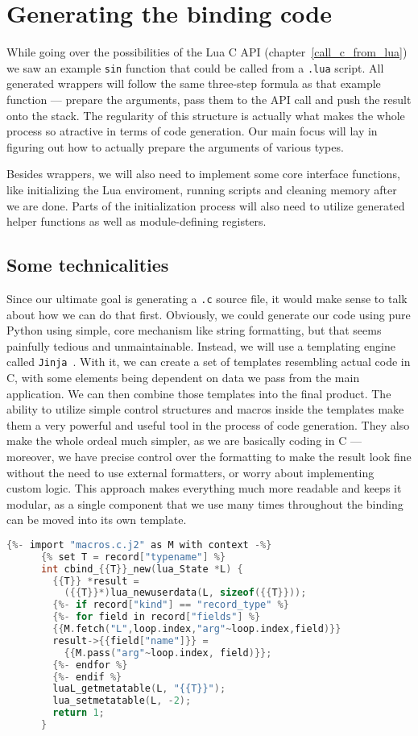 \documentclass[polish, english]{iithesis}
\begin{document}
\chapter{Generating the binding code}
  While going over the possibilities of the Lua C API (chapter~\ref{call_c_from_lua}) we saw an example \texttt{sin} function that could be called from a \texttt{.lua} script.
  All generated wrappers will follow the same three-step formula as that example function --- prepare the arguments, pass them to the API call and push the result onto the stack.
  The regularity of this structure is actually what makes the whole process so atractive in terms of code generation.
  Our main focus will lay in figuring out how to actually prepare the arguments of various types.

  Besides wrappers, we will also need to implement some core interface functions, like initializing the Lua enviroment, running scripts and cleaning memory after we are done.
  Parts of the initialization process will also need to utilize generated helper functions as well as module-defining registers.
  \section{Some technicalities}
    Since our ultimate goal is generating a \texttt{.c} source file, it would make sense to talk about how we can do that first.
    Obviously, we could generate our code using pure Python using simple, core mechanism like string formatting, but that seems painfully tedious and unmaintainable.
    Instead, we will use a templating engine called \texttt{Jinja}~\cite{jinja2}.
    With it, we can create a set of templates resembling actual code in C, with some elements being dependent on data we pass from the main application.
    We can then combine those templates into the final product.
    The ability to utilize simple control structures and macros inside the templates make them a very powerful and useful tool in the process of code generation.
    They also make the whole ordeal much simpler, as we are basically coding in C --- moreover, we have precise control over the formatting to make the result look fine without the need to use external formatters, or worry about implementing custom logic.
    This approach makes everything much more readable and keeps it modular, as a single component that we use many times throughout the binding can be moved into its own template.
    \begin{lstlisting}[language=c, caption=Example \texttt{Jinja} C template.]
      {%- import "macros.c.j2" as M with context -%}
      {% set T = record["typename"] %}
      int cbind_{{T}}_new(lua_State *L) {
        {{T}} *result = 
          ({{T}}*)lua_newuserdata(L, sizeof({{T}}));
        {%- if record["kind"] == "record_type" %}
        {%- for field in record["fields"] %}
        {{M.fetch("L",loop.index,"arg"~loop.index,field)}}
        result->{{field["name"]}} = 
          {{M.pass("arg"~loop.index, field)}};
        {%- endfor %}
        {%- endif %}
        luaL_getmetatable(L, "{{T}}");
        lua_setmetatable(L, -2);
        return 1;
      }
    \end{lstlisting}
\end{document}
